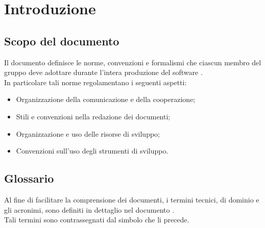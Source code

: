 \section{Introduzione}

\subsection{Scopo del documento}

Il documento definisce le norme, convenzioni e formalismi  che ciascun membro del gruppo \gruppo{} deve adottare durante l'intera produzione del software \progetto{}.\\
In particolare tali norme regolamentano i seguenti aspetti:

\begin{itemize}
\item Organizzazione della comunicazione e della cooperazione;
\item Stili e convenzioni nella redazione dei documenti;
\item Organizzazione e uso delle risorse di sviluppo;
\item Convenzioni sull'uso degli strumenti di sviluppo.
\end{itemize}

\subsection{Glossario}
Al fine di facilitare la comprensione dei documenti, i termini tecnici, di dominio e gli acronimi, sono definiti in dettaglio nel documento \Glossario{}.\\
Tali termini sono contrassegnati dal simbolo  che li precede.